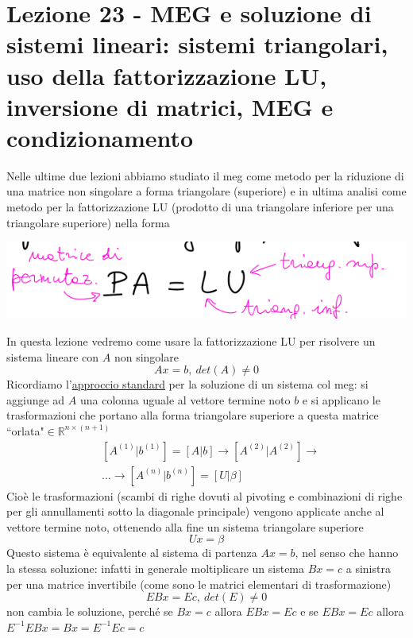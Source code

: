 \section[Lezione 23 - MEG e soluzioni di sistemi lineari]{Lezione 23 - MEG e soluzione di sistemi lineari: sistemi triangolari, uso della fattorizzazione LU, inversione di matrici, MEG e condizionamento}
Nelle ultime due lezioni abbiamo studiato il meg come metodo per la riduzione di una matrice non singolare a forma triangolare (superiore) e in ultima analisi come metodo per la fattorizzazione LU (prodotto di una triangolare inferiore per una triangolare superiore) nella forma
\begin{center}
    \includegraphics[scale=0.5]{foto/pag1}
\end{center}
In questa lezione vedremo come usare la fattorizzazione LU per risolvere un sistema lineare con $A$ non singolare
\begin{equation*}
    Ax=b, \ det(A)\neq 0
\end{equation*}
Ricordiamo l'\uline{approccio standard} per la soluzione di un sistema col meg: si aggiunge ad $A$ una colonna uguale al vettore termine noto $b$ e si applicano le trasformazioni che portano alla forma triangolare superiore a questa matrice ``orlata"$\in \mathbb{R}^{n \times (n+1)}$
\begin{equation*}
    \begin{split}
        & [A^{(1)}|b^{(1)}] = [A|b]\rightarrow [A^{(2)}|A^{(2)}] \rightarrow \\
        & ... \rightarrow [A^{(n)}|b^{(n)}] = [U|\beta]
    \end{split}
\end{equation*}
Cioè le trasformazioni (scambi di righe dovuti al pivoting e combinazioni di righe per gli annullamenti sotto la diagonale principale) vengono applicate anche al vettore termine noto, ottenendo alla fine un sistema triangolare superiore
\begin{equation*}
    Ux=\beta
\end{equation*}
Questo sistema è equivalente al sistema di partenza $Ax=b$, nel senso che hanno la stessa soluzione: infatti in generale moltiplicare un sistema $Bx=c$ a sinistra per una matrice invertibile (come sono le matrici elementari di trasformazione)
\begin{equation*}
    EBx = Ec, \ det(E) \neq 0
\end{equation*}
non cambia le soluzione, perché se $Bx=c$ allora $EBx=Ec$ e se $EBx=Ec$ allora $E^{-1}EBx = Bx = E^{-1}Ec = c$

